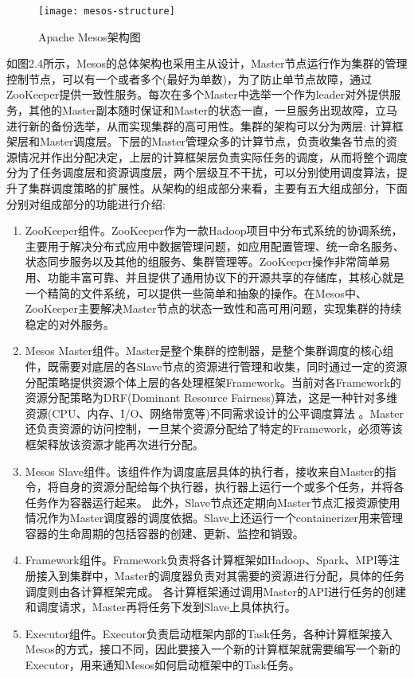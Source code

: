 \begin{figure}[H] %
	\centering
	\texttt{[image: mesos-structure]}
	\caption{Apache Mesos架构图}
\end{figure}

如图2.4所示，Mesos的总体架构也采用主从设计，Master节点运行作为集群的管理控制节点，可以有一个或者多个(最好为单数)，为了防止单节点故障，通过ZooKeeper提供一致性服务。每次在多个Master中选举一个作为leader对外提供服务，其他的Master副本随时保证和Master的状态一直，一旦服务出现故障，立马进行新的备份选举，从而实现集群的高可用性。集群的架构可以分为两层: 计算框架层和Master调度层。下层的Master管理众多的计算节点，负责收集各节点的资源情况并作出分配决定，上层的计算框架层负责实际任务的调度，从而将整个调度分为了任务调度层和资源调度层，两个层级互不干扰，可以分别使用调度算法，提升了集群调度策略的扩展性。从架构的组成部分来看，主要有五大组成部分，下面分别对组成部分的功能进行介绍:
\begin{enumerate}[1.]
	\item ZooKeeper组件。ZooKeeper作为一款Hadoop项目中分布式系统的协调系统，主要用于解决分布式应用中数据管理问题，如应用配置管理、统一命名服务、状态同步服务以及其他的组服务、集群管理等。ZooKeeper操作非常简单易用、功能丰富可靠、并且提供了通用协议下的开源共享的存储库，其核心就是一个精简的文件系统，可以提供一些简单和抽象的操作。在Mesos中、ZooKeeper主要解决Master节点的状态一致性和高可用问题，实现集群的持续稳定的对外服务。
	\item Mesos Master组件。Master是整个集群的控制器，是整个集群调度的核心组件，既需要对底层的各Slave节点的资源进行管理和收集，同时通过一定的资源分配策略提供资源个体上层的各处理框架Framework。当前对各Framework的资源分配策略为DRF(Dominant Resource Fairness)算法，这是一种针对多维资源(CPU、内存、I/O、网络带宽等)不同需求设计的公平调度算法
	。Master还负责资源的访问控制，一旦某个资源分配给了特定的Framework，必须等该框架释放该资源才能再次进行分配。
	\item Mesos Slave组件。该组件作为调度底层具体的执行者，接收来自Master的指令，将自身的资源分配给每个执行器，执行器上运行一个或多个任务，并将各任务作为容器运行起来。
	此外，Slave节点还定期向Master节点汇报资源使用情况作为Master调度器的调度依据。Slave上还运行一个containerizer用来管理容器的生命周期的包括容器的创建、更新、监控和销毁。
	\item Framework组件。Framework负责将各计算框架如Hadoop、Spark、MPI等注册接入到集群中，Master的调度器负责对其需要的资源进行分配，具体的任务调度则由各计算框架完成。
	各计算框架通过调用Master的API进行任务的创建和调度请求，Master再将任务下发到Slave上具体执行。
	\item Executor组件。Executor负责启动框架内部的Task任务，各种计算框架接入Mesos的方式，接口不同，因此要接入一个新的计算框架就需要编写一个新的Executor，用来通知Mesos如何启动框架中的Task任务。
\end{enumerate}

